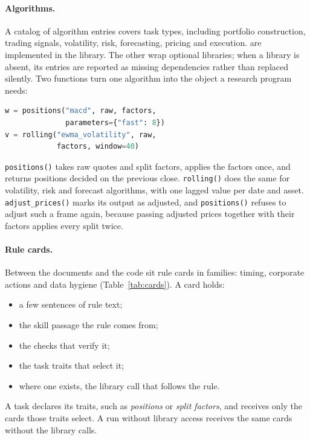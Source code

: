 \paragraph{Algorithms.}
A catalog of \NAlgorithms{} algorithm entries covers \NAlgorithmTasks{} task types,
including portfolio construction, trading signals, volatility, risk, forecasting, pricing and
execution. \NNative{} are implemented in the library. The other \NAdapters{} wrap
\NOptionalLibraries{} optional libraries; when a library is absent, its entries are reported
as missing dependencies rather than replaced silently. Two functions turn one algorithm into
the object a research program needs:
\begin{lstlisting}[language=Python]
w = positions("macd", raw, factors,
              parameters={"fast": 8})
v = rolling("ewma_volatility", raw,
            factors, window=40)
\end{lstlisting}
\texttt{positions()} takes raw quotes and split factors, applies the factors once, and
returns positions decided on the previous close. \texttt{rolling()} does the same for
volatility, risk and forecast algorithms, with one lagged value per date and asset.
\texttt{adjust\_prices()} marks its output as adjusted, and \texttt{positions()} refuses to
adjust such a frame again, because passing adjusted prices together with their factors
applies every split twice.

\paragraph{Rule cards.}
Between the documents and the code sit \NCards{} rule cards in \NCardFamilies{} families:
timing, corporate actions and data hygiene (Table~\ref{tab:cards}). A card holds:
\begin{itemize}
\item a few sentences of rule text;
\item the skill passage the rule comes from;
\item the checks that verify it;
\item the task traits that select it;
\item where one exists, the library call that follows the rule.
\end{itemize}
A task declares its traits, such as \emph{positions} or \emph{split factors}, and receives
only the cards those traits select. A run without library access receives the same cards
without the library calls.

\begin{table}[t]
\centering
\scriptsize

\caption{Rule cards by family, the checks that verify each one, and whether the card names a
library call that follows the rule.}
\label{tab:cards}
\end{table}


